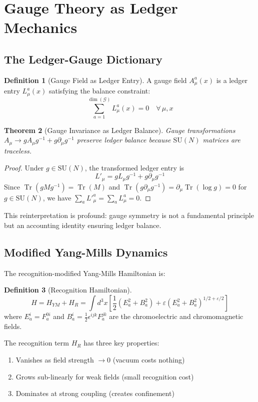 \documentclass[11pt]{article}
\theoremstyle{plain}
\newtheorem{theorem}{Theorem}[section]
\theoremstyle{definition}
\newtheorem{definition}[theorem]{Definition}
\theoremstyle{remark}
\newcommand{\Tr}{\operatorname{Tr}}
\newcommand{\SU}[1]{\text{SU}(#1)}
\begin{document}
\section{Gauge Theory as Ledger Mechanics}

\subsection{The Ledger-Gauge Dictionary}

\begin{definition}[Gauge Field as Ledger Entry]
A gauge field $A_\mu^a(x)$ is a ledger entry $L_\mu^a(x)$ satisfying the balance constraint:
\[
\sum_{a=1}^{\dim(\mathcal{G})} L_\mu^a(x) = 0 \quad \forall \, \mu, x
\]
\end{definition}

\begin{theorem}[Gauge Invariance as Ledger Balance]
Gauge transformations $A_\mu \to g A_\mu g^{-1} + g \partial_\mu g^{-1}$ preserve ledger balance because $\SU{N}$ matrices are traceless.
\end{theorem}

\begin{proof}
Under $g \in \SU{N}$, the transformed ledger entry is
\[
L'_\mu = g L_\mu g^{-1} + g \partial_\mu g^{-1}
\]
Since $\Tr(g M g^{-1}) = \Tr(M)$ and $\Tr(g \partial_\mu g^{-1}) = \partial_\mu \Tr(\log g) = 0$ for $g \in \SU{N}$, we have $\sum_a L'^a_\mu = \sum_a L^a_\mu = 0$.
\end{proof}

This reinterpretation is profound: gauge symmetry is not a fundamental principle but an accounting identity ensuring ledger balance.

\subsection{Modified Yang-Mills Dynamics}

The recognition-modified Yang-Mills Hamiltonian is:

\begin{definition}[Recognition Hamiltonian]
\[
H = H_{YM} + H_R = \int d^3x \left[\frac{1}{2}(E_a^2 + B_a^2) + \varepsilon(E_a^2 + B_a^2)^{1/2+\varepsilon/2}\right]
\]
where $E_a^i = F_a^{0i}$ and $B_a^i = \frac{1}{2}\epsilon^{ijk}F_a^{jk}$ are the chromoelectric and chromomagnetic fields.
\end{definition}

The recognition term $H_R$ has three key properties:
\begin{enumerate}
\item Vanishes as field strength $\to 0$ (vacuum costs nothing)
\item Grows sub-linearly for weak fields (small recognition cost)
\item Dominates at strong coupling (creates confinement)
\end{enumerate}
\end{document}
